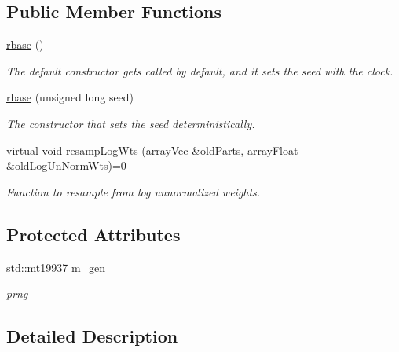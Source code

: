 \subsection*{Public Member Functions}
\begin{DoxyCompactItemize}
\item 
\mbox{\label{classrbase_aae80801bfc60ee3573cb728fc9460b0c}} 
\hyperlink{classrbase_aae80801bfc60ee3573cb728fc9460b0c}{rbase} ()
\begin{DoxyCompactList}\small\item\em The default constructor gets called by default, and it sets the seed with the clock. \end{DoxyCompactList}\item 
\hyperlink{classrbase_a63220b39e2569072713847e7bdb585bf}{rbase} (unsigned long seed)
\begin{DoxyCompactList}\small\item\em The constructor that sets the seed deterministically. \end{DoxyCompactList}\item 
virtual void \hyperlink{classrbase_aff0f6f88fd4656e67f5ebc870f10dd44}{resamp\+Log\+Wts} (\hyperlink{classrbase_aa12fc826befa6ba0647b5f59ebc396ee}{array\+Vec} \&old\+Parts, \hyperlink{classrbase_a6f76bef853e508cb5b6f546d231b06f5}{array\+Float} \&old\+Log\+Un\+Norm\+Wts)=0
\begin{DoxyCompactList}\small\item\em Function to resample from log unnormalized weights. \end{DoxyCompactList}\end{DoxyCompactItemize}
\subsection*{Protected Attributes}
\begin{DoxyCompactItemize}
\item 
\mbox{\label{classrbase_ac278c975bd5b23ad009f1ce685552c5c}} 
std\+::mt19937 \hyperlink{classrbase_ac278c975bd5b23ad009f1ce685552c5c}{m\+\_\+gen}
\begin{DoxyCompactList}\small\item\em prng \end{DoxyCompactList}\end{DoxyCompactItemize}


\subsection{Detailed Description}
